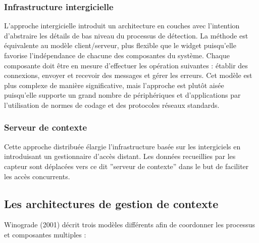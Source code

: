 \subsubsection{Infrastructure intergicielle}

L'approche intergicielle introduit un architecture en couches avec l'intention
d'abstraire les détails de bas niveau du processus de détection. La méthode est
équivalente au modèle client/serveur, plus flexible que le widget puisqu'elle
favorise l'indépendance de chacune des composantes du système. Chaque
composante doit être en mesure d'effectuer les opération suivantes : établir des
connexions, envoyer et recevoir des messages et gérer les erreurs. Cet modèle
est plus complexe de manière significative, mais l'approche est plutôt aisée
puisqu'elle supporte un grand nombre de périphériques et d'applications par
l'utilisation de normes de codage et des protocoles réseaux standards.

\subsubsection{Serveur de contexte}

Cette approche distribuée élargie l'infrastructure basée sur les intergiciels en
introduisant un gestionnaire d'accès distant. Les données recueillies par les
capteur sont déplacées vers ce dit ''serveur de contexte'' dans le but de
faciliter les accès concurrents.

\subsection{Les architectures de gestion de contexte}

Winograde (2001) \cite{winograd_architectures_2001} décrit trois modèles
différents afin de coordonner les processus et composantes multiples :

